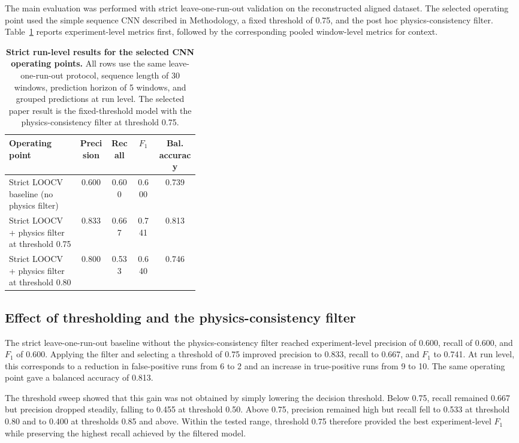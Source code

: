 \documentclass[fleqn,10pt]{wlscirep}
\begin{document}
The main evaluation was performed with strict leave-one-run-out validation on the reconstructed aligned dataset. The selected operating point used the simple sequence CNN described in Methodology, a fixed threshold of 0.75, and the post hoc physics-consistency filter. Table~\ref{tab:overall_performance} reports experiment-level metrics first, followed by the corresponding pooled window-level metrics for context.

\begin{table}[htbp]
\centering
\caption{\textbf{Strict run-level results for the selected CNN operating points.} All rows use the same leave-one-run-out protocol, sequence length of 30 windows, prediction horizon of 5 windows, and grouped predictions at run level. The selected paper result is the fixed-threshold model with the physics-consistency filter at threshold 0.75.}
\label{tab:overall_performance}
\small
\begin{tabular}{p{0.37\linewidth}cccc}
\hline
Operating point & Precision & Recall & $F_1$ & Bal. accuracy \\
\hline
Strict LOOCV baseline (no physics filter) & 0.600 & 0.600 & 0.600 & 0.739 \\
Strict LOOCV + physics filter at threshold 0.75 & 0.833 & 0.667 & 0.741 & 0.813 \\
Strict LOOCV + physics filter at threshold 0.80 & 0.800 & 0.533 & 0.640 & 0.746 \\
\hline
\end{tabular}
\end{table}

\FloatBarrier

\subsection*{Effect of thresholding and the physics-consistency filter}

The strict leave-one-run-out baseline without the physics-consistency filter reached experiment-level precision of 0.600, recall of 0.600, and $F_1$ of 0.600. Applying the filter and selecting a threshold of 0.75 improved precision to 0.833, recall to 0.667, and $F_1$ to 0.741. At run level, this corresponds to a reduction in false-positive runs from 6 to 2 and an increase in true-positive runs from 9 to 10. The same operating point gave a balanced accuracy of 0.813.

The threshold sweep showed that this gain was not obtained by simply lowering the decision threshold. Below 0.75, recall remained 0.667 but precision dropped steadily, falling to 0.455 at threshold 0.50. Above 0.75, precision remained high but recall fell to 0.533 at threshold 0.80 and to 0.400 at thresholds 0.85 and above. Within the tested range, threshold 0.75 therefore provided the best experiment-level $F_1$ while preserving the highest recall achieved by the filtered model.
\end{document}
